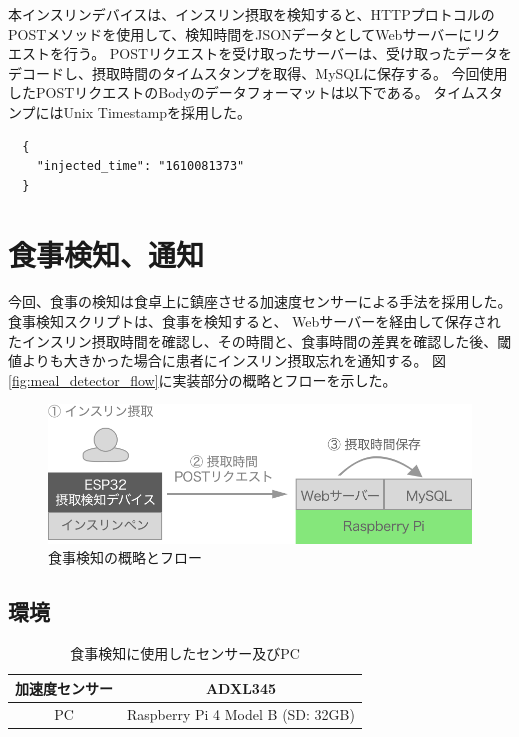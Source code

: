 本インスリンデバイスは、インスリン摂取を検知すると、HTTPプロトコルのPOSTメソッドを使用して、検知時間をJSONデータとしてWebサーバーにリクエストを行う。
POSTリクエストを受け取ったサーバーは、受け取ったデータをデコードし、摂取時間のタイムスタンプを取得、MySQLに保存する。
今回使用したPOSTリクエストのBodyのデータフォーマットは以下である。
タイムスタンプにはUnix Timestampを採用した。

\begin{verbatim}
  {
    "injected_time": "1610081373"
  }
\end{verbatim}

\section{食事検知、通知}

今回、食事の検知は食卓上に鎮座させる加速度センサーによる手法を採用した。食事検知スクリプトは、食事を検知すると、
Webサーバーを経由して保存されたインスリン摂取時間を確認し、その時間と、食事時間の差異を確認した後、閾値よりも大きかった場合に患者にインスリン摂取忘れを通知する。
図\ref{fig:meal_detector_flow}に実装部分の概略とフローを示した。

\begin{figure}[htbp]
  \caption{食事検知の概略とフロー}
  \label{fig:insulin_injection_flow}
  \begin{center}
    \includegraphics[bb=0 0 1000 270,width=18cm]{assets/insulin_injection_flow.png}
  \end{center}
\end{figure}

\subsection{環境}

\begin{table}[htbp]
  \caption{食事検知に使用したセンサー及びPC}
  \label{tb:meal_detection_spec}
  \begin{center}
    \begin{tabular}{|c||c|}
      \hline
      加速度センサー & ADXL345 \\\hline
      PC & Raspberry Pi 4 Model B (SD: 32GB) \\\hline
    \end{tabular}
  \end{center}
\end{table}

